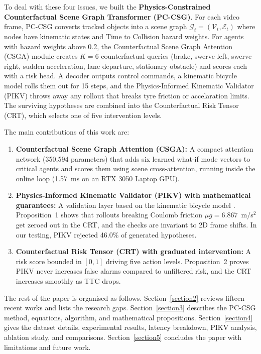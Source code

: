 \documentclass[preprint,12pt]{elsarticle}
\begin{document}
To deal with these four issues, we built the \textbf{Physics-Constrained Counterfactual Scene Graph Transformer (PC-CSG)}. For each video frame, PC-CSG converts tracked objects into a scene graph $\mathcal{G}_t = (\mathcal{V}_t, \mathcal{E}_t)$ where nodes have kinematic states and Time to Collision hazard weights. For agents with hazard weights above 0.2, the Counterfactual Scene Graph Attention (CSGA) module creates $K=6$ counterfactual queries (brake, swerve left, swerve right, sudden acceleration, lane departure, stationary obstacle) and scores each with a risk head. A decoder outputs control commands, a kinematic bicycle model rolls them out for 15 steps, and the Physics-Informed Kinematic Validator (PIKV) throws away any rollout that breaks tyre friction or accelaration limits. The surviving hypotheses are combined into the Counterfactual Risk Tensor (CRT), which selects one of five intervention levels.

The main contributions of this work are:
\begin{enumerate}
    \item \textbf{Counterfactual Scene Graph Attention (CSGA):} A compact attention network (350,594 parameters) that adds six learned what-if mode vectors to critical agents and scores them using scene cross-attention, running inside the online loop (1.57~ms on an RTX 3050 Laptop GPU).
    \item \textbf{Physics-Informed Kinematic Validator (PIKV) with mathematical guarantees:} A validation layer based on the kinematic bicycle model \cite{kong2015kinematic}. Proposition~1 shows that rollouts breaking Coulomb friction $\mu g = 6.867$~m/s$^2$ get zeroed out in the CRT, and the checks are invariant to 2D frame shifts. In our testing, PIKV rejected 46.0\% of generated hypotheses.
    \item \textbf{Counterfactual Risk Tensor (CRT) with graduated intervention:} A risk score bounded in $[0,1]$ driving five action levels. Proposition~2 proves PIKV never increases false alarms compared to unfiltered risk, and the CRT increases smoothly as TTC drops.
\end{enumerate}

The rest of the paper is organised as follows. Section~\ref{section2} reviews fifteen recent works and lists the research gaps. Section~\ref{section3} describes the PC-CSG method, equations, algorithm, and mathematical propositions. Section~\ref{section4} gives the dataset details, experimental results, latency breakdown, PIKV analysis, ablation study, and comparisons. Section~\ref{section5} concludes the paper with limitations and future work.
\end{document}
